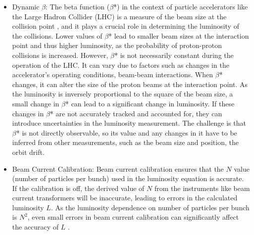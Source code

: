 \begin{itemize}
\item Dynamic $\beta$: The beta function ($\beta$*) in the context of particle accelerators like the Large Hadron Collider (LHC) is a measure of the beam size at the collision point \cite{CERNVdMOMC}, and it plays a crucial role in determining the luminosity of the collisions. Lower values of $\beta$* lead to smaller beam sizes at the interaction point and thus higher luminosity, as the probability of proton-proton collisions is increased. However, $\beta$* is not necessarily constant during the operation of the LHC. It can vary due to factors such as changes in the accelerator's operating conditions, beam-beam interactions. %
 When $\beta$* changes, it can alter the size of the proton beams at the interaction point. As the luminosity is inversely proportional to the square of the beam size, a small change in $\beta$* can lead to a significant change in luminosity. If these changes in $\beta$* are not accurately tracked and accounted for, they can introduce uncertainties in the luminosity measurement. The challenge is that $\beta$* is not directly observable, so its value and any changes in it have to be inferred from other measurements, such as the beam size and position, the orbit drift.

\item Beam Current Calibration:  Beam current calibration ensures that the \( N \) value (number of particles per bunch) used in the luminosity equation is accurate. If the calibration is off, the derived value of \( N \) from the instruments like beam current transformers will be inaccurate, leading to errors in the calculated luminosity \( L \). As the luminosity dependence on number of particles per bunch is \( N^2 \), even small errors in beam current calibration can significantly affect the accuracy of \( L \) \cite{CERNLumiDays}.



\end{itemize}
